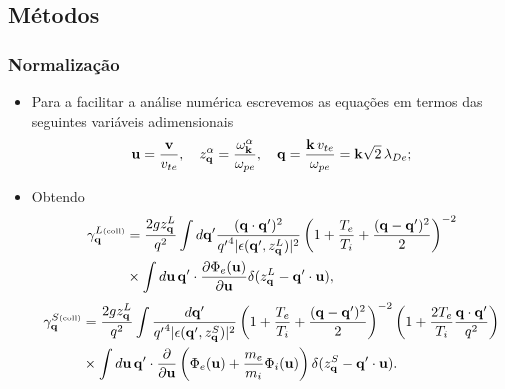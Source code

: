 \documentclass[10pt,aspectratio=1610,lualatex]{beamer}
\begin{document}
\subsection*{Métodos}
\begin{frame}
  \frametitle{Normalização}
  \begin{itemize}
    \item Para a facilitar a análise numérica escrevemos as equações
    em termos das seguintes variáveis adimensionais
    \begin{displaymath}
      {\bf u}=\frac{\bf v}{v_{te}},\quad z_{\bf q}^\alpha
      =\frac{\omega_{\bf k}^\alpha}{\omega_{pe}},\quad
      {\bf q}=\frac{{\bf k}\,v_{te}}{\omega_{pe}}
      ={\bf k}\sqrt{2}\,\lambda_{De};
    \end{displaymath}
    \item Obtendo
    \begin{equation*}
      \label{GqL}
      \begin{split}
	\gamma_{\bf q}^{L\mbox{\tiny (coll)}}
	&= \frac{2gz_{\bf q}^L}{q^2}\int
	d{\bf q}' \frac{({\bf q}\cdot {\bf q'})^2}{{q'}^4
	  |\epsilon({\bf q'},z_{\bf q}^L)|^2}\left(1+\frac{T_e}{T_i}
	  +\frac{({\bf q}-{\bf q'})^2}{2}\right)^{-2}\\
	&\times\int d{\bf u}\,{\bf q'}\cdot
	\frac{\partial \Phi_e({\bf u})}{\partial {\bf u}}
	\delta(z_{\bf q}^L-{\bf q'}\cdot{\bf u}),
      \end{split}
    \end{equation*}
    \vspace{0.2cm}
    \begin{equation*}
      \label{GqS}
      \begin{split}
	\gamma_{\bf q}^{S\mbox{\tiny(coll)}}
	&=\frac{2g z_{\bf q}^L}{q^2}
	\int\frac{d{\bf q}'}{{q'}^4|\epsilon({\bf q'},z_{\bf q}^S)|^2}
	\left(1+\frac{T_e}{T_i}+\frac{({\bf q}-{\bf q'})^2}{2}\right)^{-2}
	\left(1+\frac{2T_e}{T_i}\frac{{\bf q}\cdot{\bf q}'}{q^2}\right)\\
	&\times \int d{\bf u}\, {\bf q'}\cdot\frac{\partial}{\partial {\bf u}}
	\left(\Phi_e({\bf u})+\frac{m_e}{m_i} \Phi_i({\bf u})\right)
	\delta(z_{\bf q}^S -{\bf q'}\cdot{\bf u}).
      \end{split}
    \end{equation*}
  \end{itemize}
\end{frame}
\end{document}
